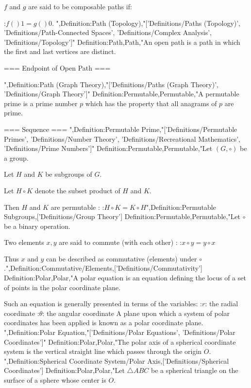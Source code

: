 $f$ and $g$ are said to be composable paths if:

:$f \left(   \right)1 = g \left(   \right)0$.
",Definition:Path (Topology),"['Definitions/Paths (Topology)', 'Definitions/Path-Connected Spaces', 'Definitions/Complex Analysis', 'Definitions/Topology']"
Definition:Path,Path,"An open path is a path in which the first and last vertices are distinct.



=== Endpoint of Open Path ===

",Definition:Path (Graph Theory),"['Definitions/Paths (Graph Theory)', 'Definitions/Graph Theory']"
Definition:Permutable,Permutable,"A permutable prime is a prime number $p$ which has the property that all anagrams of $p$ are prime.


=== Sequence ===
",Definition:Permutable Prime,"['Definitions/Permutable Primes', 'Definitions/Number Theory', 'Definitions/Recreational Mathematics', 'Definitions/Prime Numbers']"
Definition:Permutable,Permutable,"Let $\left( G, \circ \right)$ be a group.

Let $H$ and $K$ be subgroups of $G$.

Let $H \circ K$ denote the subset product of $H$ and $K$.


Then $H$ and $K$ are permutable :
:$H \circ K = K \circ H$",Definition:Permutable Subgroups,['Definitions/Group Theory']
Definition:Permutable,Permutable,"Let $\circ$ be a binary operation.


Two elements $x, y$ are said to commute (with each other) :
:$x \circ y = y \circ x$


Thus $x$ and $y$ can be described as commutative (elements) under $\circ$.",Definition:Commutative/Elements,['Definitions/Commutativity']
Definition:Polar,Polar,"A polar equation is an equation defining the locus of a set of points in the polar coordinate plane.

Such an equation is generally presented in terms of the variables:
:$r$: the radial coordinate
:$\theta$: the angular coordinate
A plane upon which a system of polar coordinates has been applied is known as a polar coordinate plane.
",Definition:Polar Equation,"['Definitions/Polar Equations', 'Definitions/Polar Coordinates']"
Definition:Polar,Polar,"The polar axis of a spherical coordinate system is the vertical straight line which passes through the origin $O$.
",Definition:Spherical Coordinate System/Polar Axis,['Definitions/Spherical Coordinates']
Definition:Polar,Polar,"Let $\triangle ABC$ be a spherical triangle on the surface of a sphere whose center is $O$.

